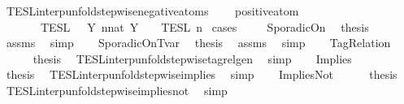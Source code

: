 \begin{isabellebody}
\isamarkupfalse%
\ TESL{\isacharunderscore}interp{\isacharunderscore}unfold{\isacharunderscore}stepwise{\isacharunderscore}negative{\isacharunderscore}atoms{\isacharcolon}\isanewline
\ \ \ {\isacartoucheopen}{\isasymnot}\ positive{\isacharunderscore}atom\ {\isasymphi}{\isacartoucheclose}\isanewline
\ \ \ \ \ {\isacartoucheopen}{\isasymlbrakk}\ {\isasymphi}\ {\isasymrbrakk}\isactrlsub T\isactrlsub E\isactrlsub S\isactrlsub L\ {\isacharequal}\ {\isasymInter}\ {\isacharbraceleft}Y{\isachardot}\ {\isasymexists}n{\isacharcolon}{\isacharcolon}nat{\isachardot}\ Y\ {\isacharequal}\ {\isasymlbrakk}\ {\isasymphi}\ {\isasymrbrakk}\isactrlsub T\isactrlsub E\isactrlsub S\isactrlsub L\isactrlbsup {\isasymge}\ n\isactrlesup {\isacharbraceright}{\isacartoucheclose}\isanewline
%
\isadelimproof
%
\endisadelimproof
%
\isatagproof
{}\isamarkupfalse%
\ {\isacharparenleft}cases\ {\isasymphi}{\isacharparenright}\isanewline
\ \ \isamarkupfalse%
\ SporadicOn\ \isamarkupfalse%
\ {\isacharquery}thesis\ \isamarkupfalse%
\ assms\ \isamarkupfalse%
\ simp\isanewline
{}\isamarkupfalse%
\isanewline
\ \ \isamarkupfalse%
\ SporadicOnTvar\ \isamarkupfalse%
\ {\isacharquery}thesis\ \isamarkupfalse%
\ assms\ \isamarkupfalse%
\ simp\isanewline
{}\isamarkupfalse%
\isanewline
\ \ \isamarkupfalse%
\ TagRelation\isanewline
\ \ \ \ \isamarkupfalse%
\ {\isacharquery}thesis\ \isamarkupfalse%
\ TESL{\isacharunderscore}interp{\isacharunderscore}unfold{\isacharunderscore}stepwise{\isacharunderscore}tagrelgen\ \isamarkupfalse%
\ simp\isanewline
{}\isamarkupfalse%
\isanewline
\ \ \isamarkupfalse%
\ Implies\isanewline
\ \ \ \ \isamarkupfalse%
\ {\isacharquery}thesis\ \isamarkupfalse%
\ TESL{\isacharunderscore}interp{\isacharunderscore}unfold{\isacharunderscore}stepwise{\isacharunderscore}implies\ \isamarkupfalse%
\ simp\isanewline
{}\isamarkupfalse%
\isanewline
\ \ \isamarkupfalse%
\ ImpliesNot\isanewline
\ \ \ \ \isamarkupfalse%
\ {\isacharquery}thesis\ \isamarkupfalse%
\ TESL{\isacharunderscore}interp{\isacharunderscore}unfold{\isacharunderscore}stepwise{\isacharunderscore}implies{\isacharunderscore}not\ \isamarkupfalse%
\ simp\isanewline
{}\isamarkupfalse%

\end{isabellebody}
